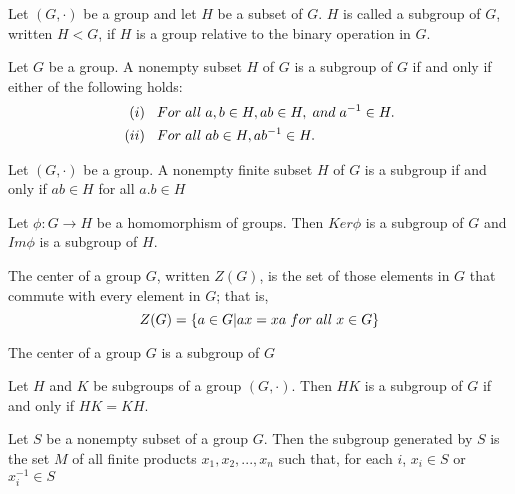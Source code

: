 \begin{defi}
Let $(G,\cdot)$ be a group and let $H$ be a subset of $G$. $H$ is called a subgroup of $G$, written $H<G$, if $H$ is a group relative to the binary operation in $G$.
\end{defi}

\begin{teo}
Let $G$ be a group. A nonempty subset $H$ of $G$ is a subgroup of $G$ if and only if either of the following holds:
\begin{align*}
    (i)&\hspace{.3cm}For\hspace{.1cm}all\hspace{.1cm}a,b\in H, ab\in H,\hspace{.1cm}and\hspace{.1cm}a^{-1}\in H.\\
    (ii)&\hspace{.3cm}For\hspace{.1cm}all\hspace{.1cm}ab\in H, ab^{-1}\in H.
\end{align*}
\end{teo}
\begin{teo}
    Let $(G,\cdot)$ be a group. A nonempty finite subset $H$ of $G$ is a subgroup if and only if $ab\in H$ for all $a.b\in H$
\end{teo}
\begin{teo}
    Let $\phi:G\rightarrow H$ be a homomorphism of groups. Then $Ker\phi$ is a subgroup of $G$ and $Im\phi$ is a subgroup of $H$.
\end{teo}
\begin{defi}
    The center of a group $G$, written $Z(G)$, is the set of those elements in $G$ that commute with every element in $G$; that is,
    \begin{equation*}
        Z(G)=\{a\in G|ax=xa\hspace{.1cm}for\hspace{.1cm}all\hspace{.1cm}x\in G\}
    \end{equation*}
\end{defi}
\begin{teo}
    The center of a group $G$ is a subgroup of $G$
\end{teo}
\begin{teo}
    Let $H$ and $K$ be subgroups of a group $(G,\cdot)$. Then $HK$ is a subgroup of $G$ if and only if $HK=KH$.
\end{teo}
\begin{teo}
    Let $S$ be a nonempty subset of a group $G$. Then the subgroup generated by $S$ is the set $M$ of all finite products $x_1,x_2,...,x_n$ such that, for each $i$, $x_i\in S$ or $x_i^{-1}\in S$
\end{teo}
